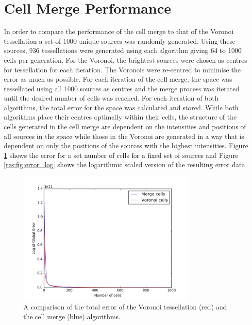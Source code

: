 \section{Cell Merge Performance}
In order to compare the performance of the cell merge to that of the Voronoi tessellation a set of 1000 unique sources was randomly generated. Using these sources, 936 tessellations were generated using each algorithm giving 64 to 1000 cells per generation. For the Voronoi, the brightest sources were chosen as centres for tessellation for each iteration. The Voronois were re-centred to minimise the error as much as possible. For each iteration of the cell merge, the space was tessellated using all 1000 sources as centres and the merge process was iterated until the desired number of cells was reached. For each iteration of both algorithms, the total error for the space was calculated and stored. While both algorithms place their centres optimally within their cells, the structure of the cells generated in the cell merge are dependent on the intensities and positions of all sources in the space while those in the Voronoi are generated in a way that is dependent on only the positions of the sources with the highest intensities. Figure \ref{res:fig:error} shows the error for a set number of cells for a fixed set of sources and Figure \ref{res:fig:error_log} shows the logarithmic scaled version of the resulting error data.
\begin{figure}[H]
\centering
\includegraphics[width=0.8\textwidth]{Images/result_error.png}
\caption{A comparison of the total error of the Voronoi tessellation (red) and the cell merge (blue) algorithms.}
\label{res:fig:error}
\end{figure}
